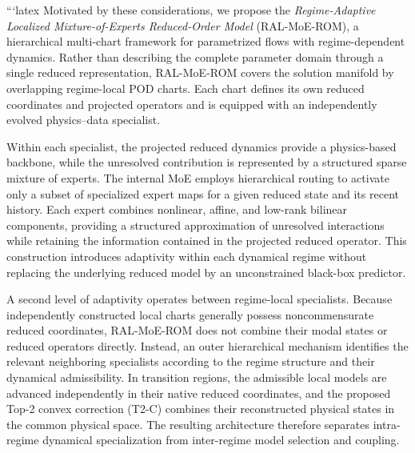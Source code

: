 ```latex
Motivated by these considerations, we propose the
\emph{Regime-Adaptive Localized Mixture-of-Experts Reduced-Order Model}
(RAL-MoE-ROM), a hierarchical multi-chart framework for parametrized flows
with regime-dependent dynamics. Rather than describing the complete
parameter domain through a single reduced representation, RAL-MoE-ROM
covers the solution manifold by overlapping regime-local POD charts. Each
chart defines its own reduced coordinates and projected operators and is
equipped with an independently evolved physics--data specialist.

Within each specialist, the projected reduced dynamics provide a
physics-based backbone, while the unresolved contribution is represented by
a structured sparse mixture of experts. The internal MoE employs hierarchical
routing to activate only a subset of specialized expert maps for a given
reduced state and its recent history. Each expert combines nonlinear,
affine, and low-rank bilinear components, providing a structured
approximation of unresolved interactions while retaining the information
contained in the projected reduced operator. This construction introduces
adaptivity within each dynamical regime without replacing the underlying
reduced model by an unconstrained black-box predictor.

A second level of adaptivity operates between regime-local specialists.
Because independently constructed local charts generally possess
noncommensurate reduced coordinates, RAL-MoE-ROM does not combine their
modal states or reduced operators directly. Instead, an outer hierarchical
mechanism identifies the relevant neighboring specialists according to the
regime structure and their dynamical admissibility. In transition regions,
the admissible local models are advanced independently in their native
reduced coordinates, and the proposed Top-2 convex correction (T2-C)
combines their reconstructed physical states in the common physical space.
The resulting architecture therefore separates intra-regime dynamical
specialization from inter-regime model selection and coupling.

